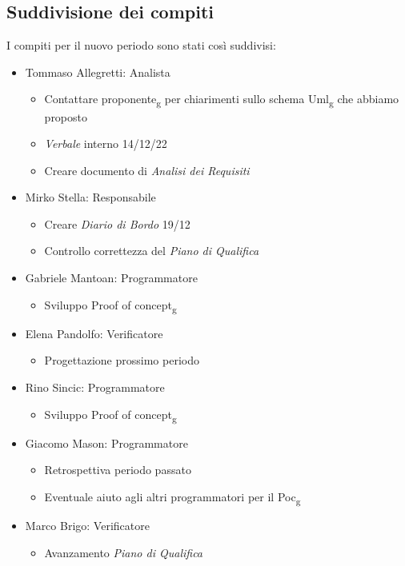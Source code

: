 \subsection{Suddivisione dei compiti}
I compiti per il nuovo periodo sono stati così suddivisi:
\begin{itemize}
	\item Tommaso Allegretti: Analista
	\begin{itemize}
		\item Contattare proponente\textsubscript{g} per chiarimenti sullo schema Uml\textsubscript{g} che abbiamo proposto
		\item \textit{Verbale} interno 14/12/22
		\item Creare documento di \textit{Analisi dei Requisiti}
	\end{itemize}
	
	\item Mirko Stella: Responsabile
	\begin{itemize}
		\item Creare \textit{Diario di Bordo} 19/12
		\item Controllo correttezza del \textit{Piano di Qualifica}
	\end{itemize}
	
	\item Gabriele Mantoan: Programmatore
	\begin{itemize}
		\item Sviluppo Proof of concept\textsubscript{g}
	\end{itemize}
	
	\item Elena Pandolfo: Verificatore
	\begin{itemize}
		\item Progettazione prossimo periodo
	\end{itemize}
	
	\item Rino Sincic: Programmatore
	\begin{itemize}
		\item Sviluppo Proof of concept\textsubscript{g}
	\end{itemize}
	
	\item Giacomo Mason: Programmatore
	\begin{itemize}
		\item Retrospettiva periodo passato
		\item Eventuale aiuto agli altri programmatori per il Poc\textsubscript{g}
	\end{itemize}
	\item Marco Brigo: Verificatore
	\begin{itemize}
		\item Avanzamento \textit{Piano di Qualifica}
	\end{itemize}
\end{itemize}


